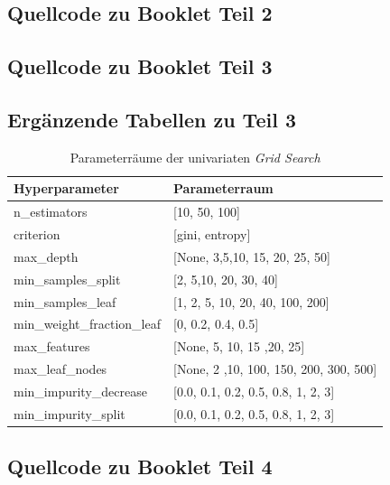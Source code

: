 \subsection{Quellcode zu Booklet Teil 2} \label{app:quellcode_booklet_2}
\pagebreak
\subsection{Quellcode zu Booklet Teil 3}
\subsection{Ergänzende Tabellen zu Teil 3}
\begin{table}[]
	\centering
	\begin{tabular}{ll}
		\hline
		Hyperparameter              & Parameterraum                              \\ \hline
		n\_estimators               & {[}10, 50, 100{]}                          \\
		criterion                   & {[}gini, entropy{]}                    \\
		max\_depth                  & {[}None, 3,5,10, 15, 20, 25, 50{]}         \\
		min\_samples\_split         & {[}2, 5,10, 20, 30, 40{]}                  \\
		min\_samples\_leaf          & {[}1, 2, 5, 10, 20, 40, 100, 200{]}                  \\
		min\_weight\_fraction\_leaf & {[}0, 0.2, 0.4, 0.5{]}                     \\
		max\_features               & {[}None, 5, 10, 15 ,20, 25{]}              \\
		max\_leaf\_nodes            & {[}None, 2 ,10, 100, 150, 200, 300, 500{]} \\
		min\_impurity\_decrease     & {[}0.0, 0.1, 0.2, 0.5, 0.8, 1, 2, 3{]}     \\
		min\_impurity\_split        & {[}0.0, 0.1, 0.2, 0.5, 0.8, 1, 2, 3{]}     \\ \hline
	\end{tabular}
	\caption{\label{table:parameter_grid_univariat} Parameterräume der univariaten \emph{Grid Search}}
\end{table}
\pagebreak
\subsection{Quellcode zu Booklet Teil 4}